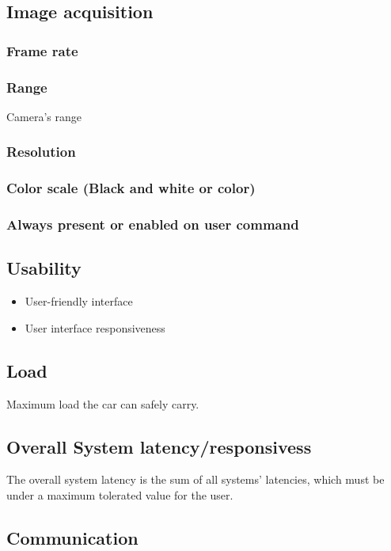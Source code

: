 \documentclass[11pt]{article}
\begin{document}
\subsection{Image acquisition}
\label{sec:orgb6a5f66}
\subsubsection{Frame rate}
\label{sec:org5adf4ee}
\subsubsection{Range}
\label{sec:orgecb044c}
Camera's range
\subsubsection{Resolution}
\label{sec:orgba87554}
\subsubsection{Color scale (Black and white or color)}
\label{sec:org468ee04}
\subsubsection{Always present or enabled on user command}
\label{sec:orgd585352}
\subsection{Usability}
\label{sec:org61632e0}
\begin{itemize}
\item User-friendly interface
\item User interface responsiveness
\end{itemize}
\subsection{Load}
\label{sec:orgca6a690}
Maximum load the car can safely carry.
\subsection{Overall System latency/responsivess}
\label{sec:org7fd1829}
The overall system latency is the sum of all systems' latencies, which must be
under a maximum tolerated value for the user.
\subsection{Communication}
\label{sec:org4241610}
\end{document}
